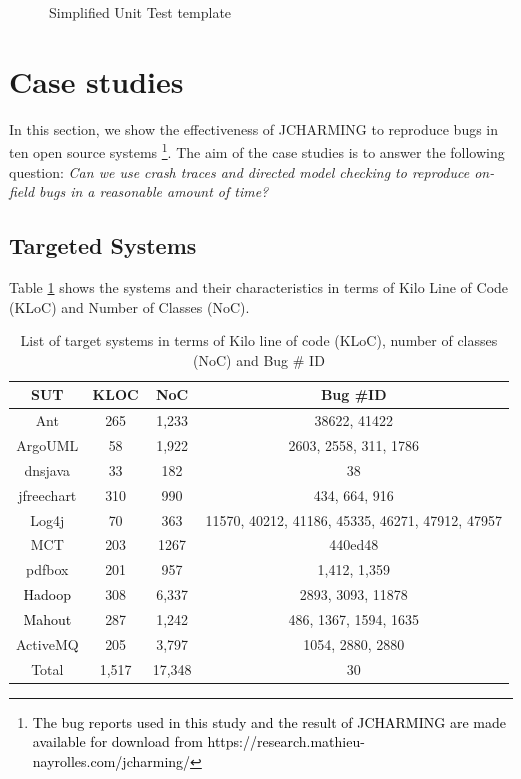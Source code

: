 \documentclass[times, doublespace]{smrauth}
\newcommand{\red}[1]{\textcolor{black}{#1}}
\begin{document}
{\begin{figure}[h!]

\noindent\fbox{%
    \parbox{\textwidth}{%
    
}%
}

    \caption{Simplified Unit Test template
    \label{fig:jcharming-unittemplate}}
\end{figure}

\section{Case studies\label{sec:cases}}

In this section, we show the effectiveness of JCHARMING to
reproduce bugs in ten open source systems
\footnote{\red{The bug reports used in this study and the result of JCHARMING are
made available for download from https://research.mathieu-nayrolles.com/jcharming/}}. The aim of the
case studies is to answer the following question: {\it Can we use
crash traces and directed model checking to reproduce on-
field bugs in a reasonable amount of time?}

\subsection{Targeted Systems}

Table \ref{tab:jacharming-systems} shows the systems and their characteristics in terms of
Kilo Line of Code (KLoC) and Number of Classes (NoC).

\begin{table}
\centering

\caption{List of target systems in terms of Kilo line of code (KLoC), number of classes (NoC) and Bug \# ID}
\begin{tabular}{c|c|c|c}
SUT        & KLOC & NoC  & Bug \#ID                                        \\ \hline \hline
Ant        & 265  & 1,233 & 38622, 41422                                    \\
ArgoUML    & 58   & 1,922 & 2603, 2558, 311, 1786                           \\
dnsjava    & 33   & 182  & 38                                              \\
jfreechart & 310  & 990  & 434, 664, 916                                   \\
Log4j      & 70   & 363  & 11570, 40212, 41186, 45335, 46271, 47912, 47957 \\
MCT        & 203  & 1267 & 440ed48                                         \\
pdfbox     & 201  & 957  & 1,412, 1,359 \\
\red{Hadoop} 	   & 308   & 6,337 & 2893, 3093, 11878\\
\red{Mahout} 	   & 287  & 1,242 &  486, 1367, 1594, 1635\\
ActiveMQ   & 205  & 3,797 & 1054, 2880, 2880\\ \hline
Total      & 1,517 & 17,348 & 30 \\
\hline \hline
\end{tabular}
\label{tab:jacharming-systems}
\end{table}


}
\end{document}
